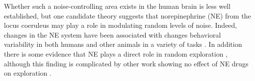 \documentclass[12pt]{article}
\begin{document}
		Whether such a noise-controlling area exists in the human brain is less well established, but one candidate theory \citep{aj2005} suggests that norepinephrine (NE) from the locus coeruleus may play a role in modulating random levels of noise. Indeed, changes in the NE system have been associated with changes behavioral variability in both humans and other animals in a variety of tasks \citep{eeKarpova14, eeKeung18}.  In addition there is some evidence that NE plays a direct role in random exploration \citep{eeWarren17}, although this finding is complicated by other work showing no effect of NE drugs on exploration \citep{jepma2012, nieuwenhuis05}. 
		
		
		
		
		
		
		
		
		
\end{document}
